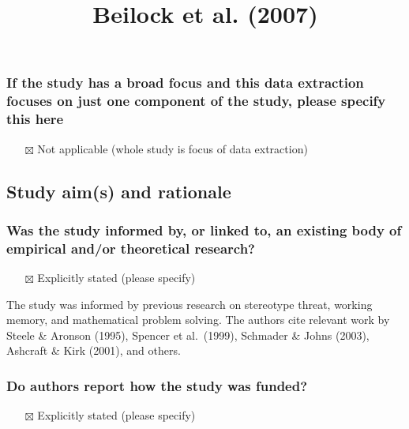 \documentclass[
  doc, a4paper]{apa7}
\title{Beilock et al. (2007)}
\author{\phantom{0}}
\date{}
\affiliation{\phantom{0}}
\providecommand{\tightlist}{%
  \setlength{\itemsep}{0pt}\setlength{\parskip}{0pt}}
\begin{document}
\maketitle

\subsubsection{If the study has a broad focus and this data extraction focuses on just one component of the study, please specify this here}\label{if-the-study-has-a-broad-focus-and-this-data-extraction-focuses-on-just-one-component-of-the-study-please-specify-this-here}

\begin{itemize}
\tightlist
\item[$\boxtimes$]
  Not applicable (whole study is focus of data extraction)
\end{itemize}

\subsection{Study aim(s) and rationale}\label{study-aims-and-rationale}

\subsubsection{Was the study informed by, or linked to, an existing body of empirical and/or theoretical research?}\label{was-the-study-informed-by-or-linked-to-an-existing-body-of-empirical-andor-theoretical-research}

\begin{itemize}
\tightlist
\item[$\boxtimes$]
  Explicitly stated (please specify)
\end{itemize}

The study was informed by previous research on stereotype threat, working memory, and mathematical problem solving. The authors cite relevant work by Steele \& Aronson (1995), Spencer et al.~(1999), Schmader \& Johns (2003), Ashcraft \& Kirk (2001), and others.

\subsubsection{Do authors report how the study was funded?}\label{do-authors-report-how-the-study-was-funded}

\begin{itemize}
\tightlist
\item[$\boxtimes$]
  Explicitly stated (please specify)
\end{itemize}
\end{document}
